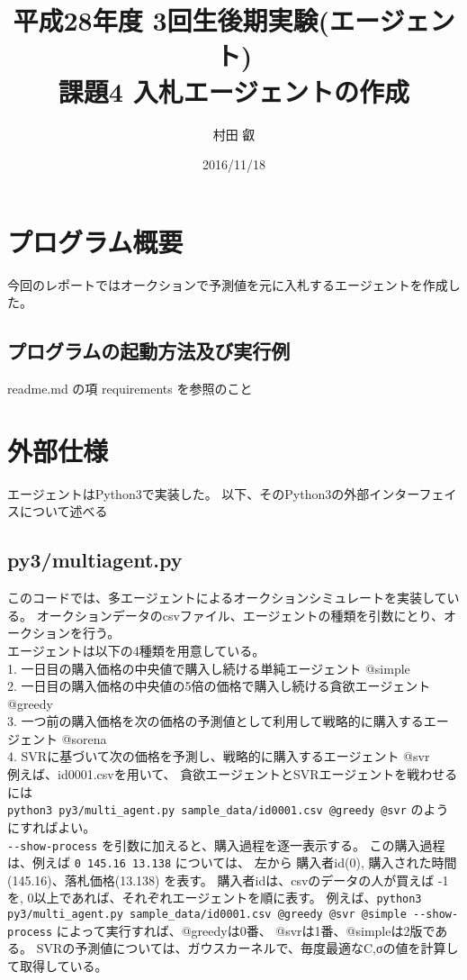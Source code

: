 \documentclass[]{jsarticle}
\begin{document}
\title{平成28年度 3回生後期実験(エージェント) \\ 課題4 入札エージェントの作成 }
\author{村田 叡}
\date{ 2016/11/18 }
\maketitle

\section{プログラム概要}
今回のレポートではオークションで予測値を元に入札するエージェントを作成した。

\subsection{プログラムの起動方法及び実行例}
readme.md  の項 requirements を参照のこと

\section{外部仕様}
エージェントはPython3で実装した。
以下、そのPython3の外部インターフェイスについて述べる

\subsection{py3/multiagent.py}
このコードでは、多エージェントによるオークションシミュレートを実装している。
オークションデータのcsvファイル、エージェントの種類を引数にとり、オークションを行う。 \\
エージェントは以下の4種類を用意している。 \\
1. 一日目の購入価格の中央値で購入し続ける単純エージェント @simple \\
2. 一日目の購入価格の中央値の5倍の価格で購入し続ける貪欲エージェント @greedy \\
3. 一つ前の購入価格を次の価格の予測値として利用して戦略的に購入するエージェント @sorena \\
4. SVRに基づいて次の価格を予測し、戦略的に購入するエージェント @svr \\
例えば、id0001.csvを用いて、 貪欲エージェントとSVRエージェントを戦わせるには \\
\verb|python3 py3/multi_agent.py sample_data/id0001.csv @greedy @svr|
のようにすればよい。 \\
\verb|--show-process| を引数に加えると、購入過程を逐一表示する。
この購入過程は、例えば \verb|0 145.16 13.138| については、
左から 購入者id(0), 購入された時間(145.16)、落札価格(13.138) を表す。
購入者idは、csvのデータの人が買えば -1を,
0以上であれば、それぞれエージェントを順に表す。
例えば、\verb|python3 py3/multi_agent.py sample_data/id0001.csv @greedy @svr @simple --show-process|
 によって実行すれば、@greedyは0番、 @svrは1番、@simpleは2版である。
SVRの予測値については、ガウスカーネルで、毎度最適なC,σの値を計算して取得している。
\end{document}
